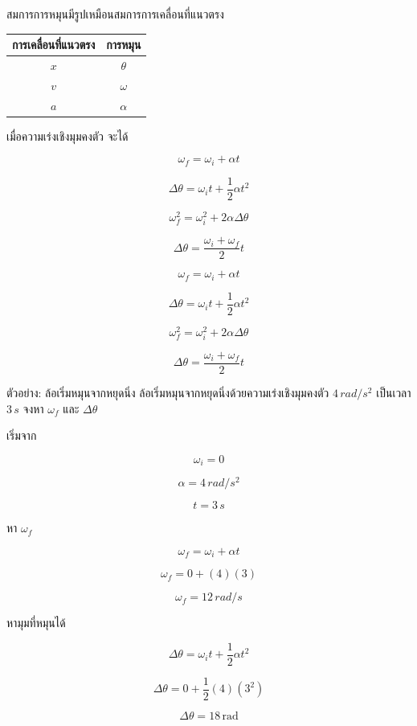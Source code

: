 สมการการหมุนมีรูปเหมือนสมการการเคลื่อนที่แนวตรง

\begin{center}
\begin{tabular}{|c|c|}
\hline
\textbf{การเคลื่อนที่แนวตรง} & \textbf{การหมุน} \\
\hline
$x$ & $\theta$ \\
\hline
$v$ & $\omega$ \\
\hline
$a$ & $\alpha$ \\
\hline
\end{tabular}
\end{center}

เมื่อความเร่งเชิงมุมคงตัว จะได้

\[
\omega_f=\omega_i+\alpha t
\]

\[
\Delta\theta=\omega_i t+\frac{1}{2}\alpha t^2
\]

\[
\omega_f^2=\omega_i^2+2\alpha\Delta\theta
\]

\[
\Delta\theta=\frac{\omega_i+\omega_f}{2}t
\]

\begin{tcolorbox}[title=สมการการหมุนเมื่อ $\alpha$ คงตัว]
\[
\omega_f=\omega_i+\alpha t
\]

\[
\Delta\theta=\omega_i t+\frac{1}{2}\alpha t^2
\]

\[
\omega_f^2=\omega_i^2+2\alpha\Delta\theta
\]

\[
\Delta\theta=\frac{\omega_i+\omega_f}{2}t
\]
\end{tcolorbox}

\begin{examplebox}{ตัวอย่าง: ล้อเริ่มหมุนจากหยุดนิ่ง}
ล้อเริ่มหมุนจากหยุดนิ่งด้วยความเร่งเชิงมุมคงตัว $4\,\si{rad/s^2}$ เป็นเวลา $3\,\si{s}$ จงหา $\omega_f$ และ $\Delta\theta$

เริ่มจาก

\[
\omega_i=0
\]

\[
\alpha=4\,\si{rad/s^2}
\]

\[
t=3\,\si{s}
\]

หา $\omega_f$

\[
\omega_f=\omega_i+\alpha t
\]

\[
\omega_f=0+(4)(3)
\]

\[
\omega_f=12\,\si{rad/s}
\]

หามุมที่หมุนได้

\[
\Delta\theta=\omega_i t+\frac{1}{2}\alpha t^2
\]

\[
\Delta\theta=0+\frac{1}{2}(4)(3^2)
\]

\[
\Delta\theta=18\,\text{rad}
\]
\end{examplebox}

